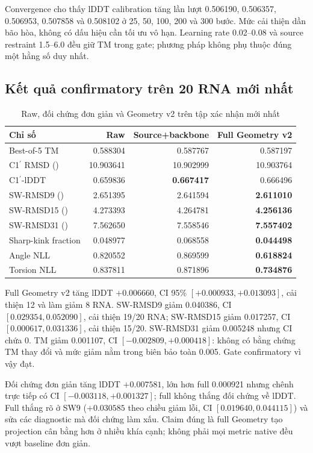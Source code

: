 \documentclass[12pt,a4paper,oneside]{report}
\newcommand{\cprime}{C1$^{\prime}$}
\newcommand{\angstrom}{\text{\AA}}
\begin{document}
Convergence cho thấy lDDT calibration tăng lần lượt 0.506190, 0.506357, 0.506953,
0.507858 và 0.508102 ở 25, 50, 100, 200 và 300 bước. Mức cải thiện dần bão hòa, không
có dấu hiệu cần tối ưu vô hạn. Learning rate 0.02--0.08 và source restraint 1.5--6.0
đều giữ TM trong gate; phương pháp không phụ thuộc đúng một hằng số duy nhất.

\subsection{Kết quả confirmatory trên 20 RNA mới nhất}

\begin{table}[H]
\centering
\caption{Raw, đối chứng đơn giản và Geometry v2 trên tập xác nhận mới nhất}
\small
\begin{tabular}{lrrr}
\toprule
Chỉ số & Raw & Source+backbone & Full Geometry v2\\
\midrule
Best-of-5 TM & 0.588304 & 0.587767 & 0.587197\\
\cprime{} RMSD (\angstrom) & 10.903641 & 10.902999 & 10.903764\\
\cprime{}-lDDT & 0.659836 & \textbf{0.667417} & 0.666496\\
SW-RMSD9 (\angstrom) & 2.651395 & 2.641594 & \textbf{2.611010}\\
SW-RMSD15 (\angstrom) & 4.273393 & 4.264781 & \textbf{4.256136}\\
SW-RMSD31 (\angstrom) & 7.562650 & 7.558546 & \textbf{7.557402}\\
Sharp-kink fraction & 0.048977 & 0.068558 & \textbf{0.044498}\\
Angle NLL & 0.820552 & 0.869599 & \textbf{0.618824}\\
Torsion NLL & 0.837811 & 0.871896 & \textbf{0.734876}\\
\bottomrule
\end{tabular}
\end{table}

Full Geometry v2 tăng lDDT $+0.006660$, CI 95\%
$[+0.000933,+0.013093]$, cải thiện 12 và làm giảm 8 RNA. SW-RMSD9 giảm 0.040386,
CI $[0.029354,0.052090]$, cải thiện 19/20 RNA; SW-RMSD15 giảm 0.017257,
CI $[0.000617,0.031336]$, cải thiện 15/20. SW-RMSD31 giảm 0.005248 nhưng CI chứa 0.
TM giảm 0.001107, CI $[-0.002809,+0.000418]$: không có bằng chứng TM thay đổi và mức
giảm nằm trong biên bảo toàn 0.005. Gate confirmatory vì vậy đạt.

Đối chứng đơn giản tăng lDDT $+0.007581$, lớn hơn full 0.000921 nhưng chênh trực tiếp có
CI $[-0.003118,+0.001327]$; full không thắng đối chứng về lDDT. Full thắng rõ ở SW9
($+0.030585$ theo chiều giảm lỗi, CI $[0.019640,0.044115]$) và sửa các diagnostic mà
đối chứng làm xấu. Claim đúng là full Geometry tạo projection cân bằng hơn ở nhiều
khía cạnh; không phải mọi metric native đều vượt baseline đơn giản.
\end{document}
